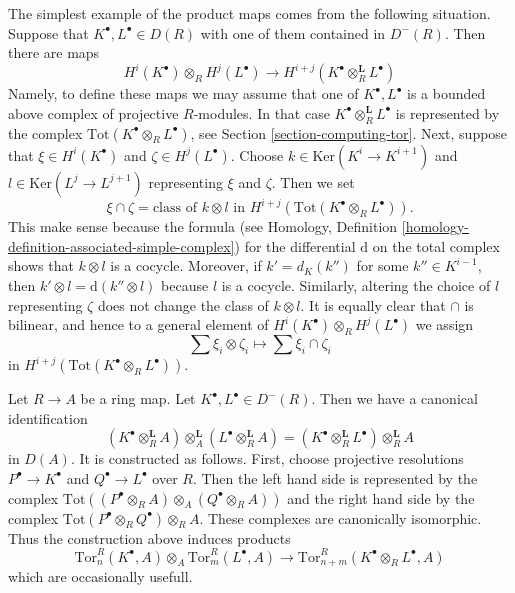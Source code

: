 \noindent
The simplest example of the product maps comes from the following situation.
Suppose that $K^\bullet, L^\bullet \in D(R)$ with one of them contained
in $D^{-}(R)$. Then there are maps
\begin{equation}
\label{equation-simple-tor-product}
H^i(K^\bullet) \otimes_R H^j(L^\bullet)
\longrightarrow
H^{i + j}(K^\bullet \otimes_R^{\mathbf{L}} L^\bullet)
\end{equation}
Namely, to define these maps we may assume that one of $K^\bullet, L^\bullet$
is a bounded above complex of projective $R$-modules. In that case
$K^\bullet \otimes_R^{\mathbf{L}} L^\bullet$ is represented by the
complex $\text{Tot}(K^\bullet \otimes_R L^\bullet)$, see
Section \ref{section-computing-tor}.
Next, suppose that $\xi \in H^i(K^\bullet)$ and $\zeta \in H^j(L^\bullet)$.
Choose $k \in \text{Ker}(K^i \to K^{i + 1})$ and
$l \in \text{Ker}(L^j \to L^{j + 1})$ representing $\xi$ and $\zeta$.
Then we set
$$
\xi \cap \zeta =
\text{class of }k \otimes l\text{ in }
H^{i + j}(\text{Tot}(K^\bullet \otimes_R L^\bullet)).
$$
This make sense because the formula (see
Homology, Definition \ref{homology-definition-associated-simple-complex})
for the differential $\text{d}$ on the total complex shows that
$k \otimes l$ is a cocycle. Moreover, if $k' = d_K(k'')$ for some
$k'' \in K^{i - 1}$, then $k' \otimes l = \text{d}(k'' \otimes l)$
because $l$ is a cocycle. Similarly, altering the choice of $l$
representing $\zeta$ does not change the class of $k \otimes l$.
It is equally clear that $\cap$ is bilinear, and hence
to a general element of $H^i(K^\bullet) \otimes_R H^j(L^\bullet)$
we assign 
$$
\sum \xi_i \otimes \zeta_i \longmapsto \sum \xi_i \cap \zeta_i
$$
in $H^{i + j}(\text{Tot}(K^\bullet \otimes_R L^\bullet))$.

\medskip\noindent
Let $R \to A$ be a ring map. Let $K^\bullet, L^\bullet \in D^{-}(R)$.
Then we have a canonical identification
\begin{equation}
\label{equation-pullback-derived-tensor-product}
(K^\bullet \otimes_R^{\mathbf{L}} A)
\otimes_A^{\mathbf{L}}
(L^\bullet \otimes_R^{\mathbf{L}} A)
=
(K^\bullet \otimes_R^{\mathbf{L}} L^\bullet) \otimes_R^{\mathbf{L}} A
\end{equation}
in $D(A)$. It is constructed as follows. First, choose projective resolutions
$P^\bullet \to K^\bullet$ and $Q^\bullet \to L^\bullet$
over $R$. Then the left hand side is represented by the complex
$\text{Tot}((P^\bullet \otimes_R A) \otimes_A (Q^\bullet \otimes_R A))$
and the right hand side by the complex
$\text{Tot}(P^\bullet \otimes_R Q^\bullet) \otimes_R A$. These
complexes are canonically isomorphic. Thus the construction above
induces products
$$
\text{Tor}^R_n(K^\bullet, A) \otimes_A \text{Tor}^R_m(L^\bullet, A)
\longrightarrow \text{Tor}_{n + m}^R(K^\bullet \otimes_R L^\bullet, A)
$$
which are occasionally usefull.

